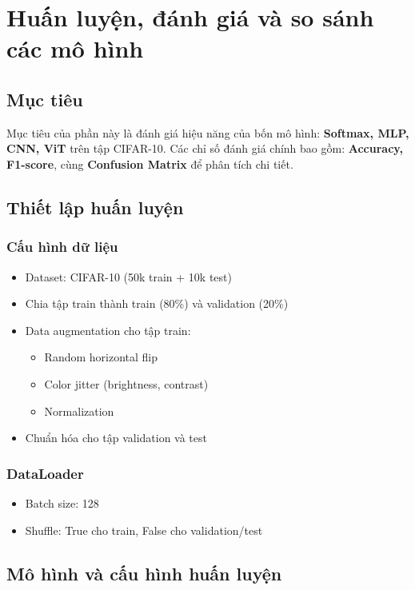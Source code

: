 \section{Huấn luyện, đánh giá và so sánh các mô hình}

\subsection{Mục tiêu}
Mục tiêu của phần này là đánh giá hiệu năng của bốn mô hình: \textbf{Softmax, MLP, CNN, ViT} trên tập CIFAR-10. 
Các chỉ số đánh giá chính bao gồm: 
\textbf{Accuracy, F1-score}, cùng \textbf{Confusion Matrix} để phân tích chi tiết.

\subsection{Thiết lập huấn luyện}

\subsubsection{Cấu hình dữ liệu}
\begin{itemize}
    \item Dataset: CIFAR-10 (50k train + 10k test)
    \item Chia tập train thành train (80\%) và validation (20\%)
    \item Data augmentation cho tập train:
    \begin{itemize}
        \item Random horizontal flip
        \item Color jitter (brightness, contrast)
        \item Normalization
    \end{itemize}
    \item Chuẩn hóa cho tập validation và test
\end{itemize}

\subsubsection{DataLoader}
\begin{itemize}
    \item Batch size: 128
    \item Shuffle: True cho train, False cho validation/test
\end{itemize}

\subsection{Mô hình và cấu hình huấn luyện}

